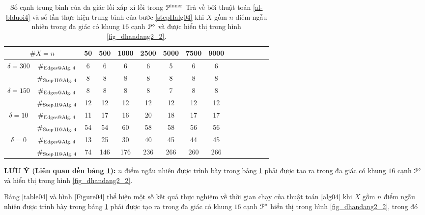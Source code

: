 \documentclass[12pt,a4paper,openany,oneside]{report}
\begin{document}
\begin{table}[ht]
	\begin{center}\renewcommand{\arraystretch}{1.2}\small
		\setlength\tabcolsep{0.05cm}
		\begin{tabular}{|c|c||c|c|c|c|c|c|c|c|c|c|c|c|c|}
			\hline
			\multicolumn {2}{|c||}{\footnotesize $\#X=n$}  &50& 500& 1000& 2500& 5000& 7500& 9000\\ 
			\hline		
			\hline
			{ $\delta = 300$}
			
			& $\#_{\rm Edges@ Alg.\, 4}$  &6&6&6&6&5&6&6\\
			
			& $\#_{\rm Step\, II @ Alg.\, 4}$&8&8&8&8&8&8&8   \\
			\hline
			{ $\delta = 150$}
			
			& $\#_{\rm Edges@ Alg.\, 4}$  &8&8&8&8&7&8&8 \\
			
			& $\#_{\rm Step\, II @ Alg.\, 4}$&12&12&12&12&12&12&12\\
			\hline
			{ $\delta = 10$}
			
			& $\#_{\rm Edges@ Alg.\, 4}$  &11&17&16&20&18&17&17 \\
			
			& $\#_{\rm Step\, II @ Alg.\, 4}$&54&54&60&58&58&56&56  \\
			\hline
			{ $\delta = 0$}
			
			& $\#_{\rm Edges@ Alg.\, 4}$  &13&25&30&40&45&44&45 \\
			
			& $\#_{\rm Step\, II @ Alg.\, 4}$&74&146&176&236&266&260&266   \\
			\hline
		\end{tabular}
		\caption{Số cạnh trung bình của đa giác lồi xấp xỉ lồi trong ${\cal P}^{\rm inner}$ Trả về bởi thuật toán \ref{al-blduoi4} và số lần thực hiện trung bình của bước \ref{stepIIalg04} khi $X$ gồm $n$ điểm ngẫu nhiên trong đa giác có khung $16$ cạnh ${\cal P}^\diamond$ và được hiển thị trong hình \ref{fig_dhandang2_2}.}
		\label{table03}
	\end{center}
\end{table} 	

	\bigskip\noindent
	{\bf LƯU Ý (Liên quan đến bảng \ref{table03}):}  $n$ điểm ngẫu nhiên được trình bày trong bảng \ref{table03} phải được tạo ra trong đa giác có khung $16$ cạnh ${\cal P}^\diamond$ và hiển thị trong hình \ref{fig_dhandang2_2}.
	
	\bigskip

\medskip
Bảng \ref{table04} và hình \ref{Figure04}  thể hiện một số kết quả thực nghiệm về thời gian chạy của thuật toán  \ref{alg04} khi $X$ gồm $n$ điểm ngẫu nhiên được trình bày trong bảng \ref{table03} phải được tạo ra trong đa giác có khung $16$ cạnh ${\cal P}^\diamond$ hiển thị trong hình \ref{fig_dhandang2_2}, trong đó
\end{document}
